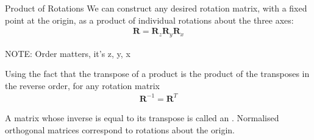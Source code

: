 \documentclass[../COS3712_Notes.tex]{subfiles}
\begin{document}
        \begin{sidenote}{Product of Rotations}
          We can construct any desired rotation matrix, with a fixed point at the origin,
          as a product of individual rotations about the three axes:
          \begin{align*}
            \mathbf{R} = \mathbf{R}_z\mathbf{R}_y\mathbf{R}_x
          \end{align*}

          NOTE: Order matters, it's z, y, x
        \end{sidenote}

        Using the fact that the transpose of a product is the product of the transposes
        in the reverse order, for any rotation matrix
        \begin{align*}
          \mathbf{R}^{-1} = \mathbf{R}^T
        \end{align*}

        A matrix whose inverse is equal to its transpose is called an .
        Normalised orthogonal matrices correspond to rotations about the origin.
\end{document}
